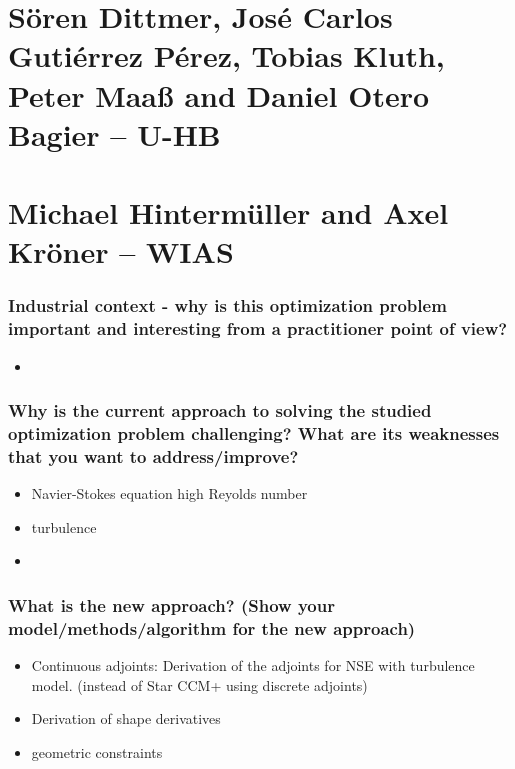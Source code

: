 \documentclass{ROMSOC}
\begin{document}
\newpage
\part[~\\(Sören Dittmer, José Carlos Gutiérrez Pérez, Tobias Kluth, Peter Maaß and Daniel Otero Bagier -- U-HB)]{\normalsize Sören Dittmer, José Carlos Gutiérrez Pérez, Tobias Kluth, Peter Maaß and Daniel Otero Bagier -- U-HB}


\newpage
\part[~\\(Michael Hintermüller and Axel Kröner -- WIAS)]{\normalsize Michael Hintermüller and Axel Kröner -- WIAS}



\section{Industrial context - why is this optimization problem important and interesting from a practitioner point of view?}


\begin{itemize}
 \item 
\end{itemize}


\section{Why is the current approach to solving the studied optimization problem challenging? What are its weaknesses that you want to address/improve?}

\begin{itemize}
 \item Navier-Stokes equation high Reyolds number
 \item turbulence
 \item
\end{itemize}

\section{What is the new approach? (Show your model/methods/algorithm for the new approach)}

\begin{itemize}
 \item Continuous adjoints: Derivation of the adjoints for NSE with turbulence model. (instead of Star CCM+ using discrete adjoints)
 \item Derivation of shape derivatives
 \item geometric constraints
\end{itemize}
\end{document}
